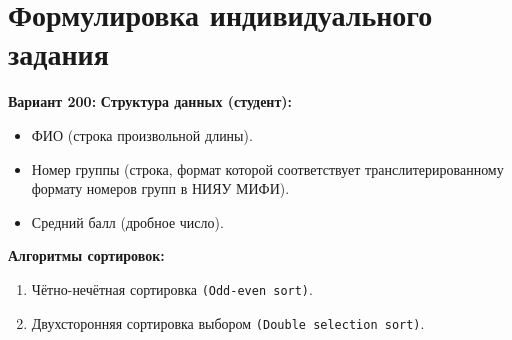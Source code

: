 \section{Формулировка индивидуального задания}

\noindent\textbf{\large Вариант 200:}\smallskip
\newline\noindent\textbf{Структура данных (студент):}
\begin{itemize}
    \item ФИО (строка произвольной длины).
    \item Номер группы (строка, формат которой соответствует транслитерированному формату номеров групп в НИЯУ МИФИ).
    \item Средний балл (дробное число).
\end{itemize}

\noindent\textbf{Алгоритмы сортировок:}
\begin{enumerate}
    \item Чётно-нечётная сортировка \texttt{(Odd-even sort)}.
    \item Двухсторонняя сортировка выбором \texttt{(Double selection sort)}.
\end{enumerate}
